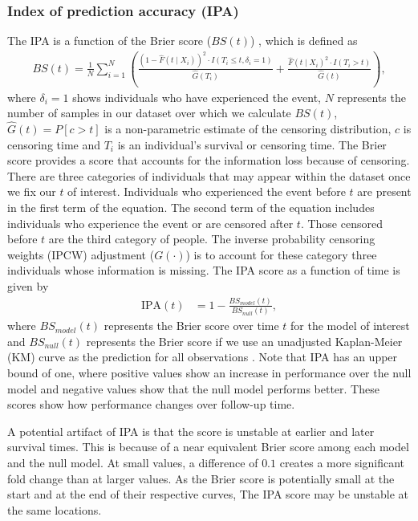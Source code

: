 \documentclass[AMA,STIX1COL,]{WileyNJD-v2}
\begin{document}
\hypertarget{index-of-prediction-accuracy-ipa}{%
\subsubsection{Index of prediction accuracy
(IPA)}\label{index-of-prediction-accuracy-ipa}}

The IPA is a function of the Brier score (\(BS(t)\)) \citep{graf1999},
which is defined as \begin{align}
BS(t)=\frac{1}{N}\sum^{N}_{i=1}\left(\frac{\left(1 - \widehat{F}(t \mid X_{i})\right)^{2}\cdot I(T_{i}\leq t,\delta_{i}=1)}{\widehat{G}(T_{i})} + \frac{\widehat{F}(t\mid X_{i})^{2}\cdot I(T_{i}>t)}{\widehat{G}(t)}\right),
\end{align} where \(\delta_{i}=1\) shows individuals who have
experienced the event, \(N\) represents the number of samples in our
dataset over which we calculate \(BS(t)\), \(\widehat{G}(t)=P[c>t]\) is
a non-parametric estimate of the censoring distribution, \(c\) is
censoring time and \(T_{i}\) is an individual's survival or censoring
time. The Brier score provides a score that accounts for the information
loss because of censoring. There are three categories of individuals
that may appear within the dataset once we fix our \(t\) of interest.
Individuals who experienced the event before \(t\) are present in the
first term of the equation. The second term of the equation includes
individuals who experience the event or are censored after \(t\). Those
censored before \(t\) are the third category of people. The inverse
probability censoring weights (IPCW) adjustment (\(G(\cdot)\)) is to
account for these category three individuals whose information is
missing. The IPA score as a function of time is given by \begin{align}
\textrm{IPA}(t) &= 1-\frac{BS_{model}(t)}{BS_{null}(t)}, \nonumber
\end{align} where \(BS_{model}(t)\) represents the Brier score over time
\(t\) for the model of interest and \(BS_{null}(t)\) represents the
Brier score if we use an unadjusted Kaplan-Meier (KM) curve as the
prediction for all observations \citep{kattan2018index}. Note that IPA
has an upper bound of one, where positive values show an increase in
performance over the null model and negative values show that the null
model performs better. These scores show how performance changes over
follow-up time.

A potential artifact of IPA is that the score is unstable at earlier and
later survival times. This is because of a near equivalent Brier score
among each model and the null model. At small values, a difference of
\(0.1\) creates a more significant fold change than at larger values. As
the Brier score is potentially small at the start and at the end of
their respective curves, The IPA score may be unstable at the same
locations.
\end{document}
